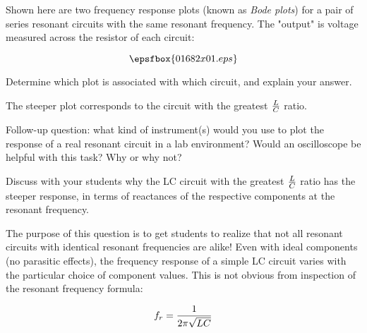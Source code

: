 

Shown here are two frequency response plots (known as {\it Bode plots}) for a pair of series resonant circuits with the same resonant frequency.  The "output" is voltage measured across the resistor of each circuit:

$$\epsfbox{01682x01.eps}$$

Determine which plot is associated with which circuit, and explain your answer.







The steeper plot corresponds to the circuit with the greatest ${L \over C}$ ratio.

\vskip 10pt

Follow-up question: what kind of instrument(s) would you use to plot the response of a real resonant circuit in a lab environment?  Would an oscilloscope be helpful with this task?  Why or why not?







Discuss with your students why the LC circuit with the greatest ${L \over C}$ ratio has the steeper response, in terms of reactances of the respective components at the resonant frequency.

The purpose of this question is to get students to realize that not all resonant circuits with identical resonant frequencies are alike!  Even with ideal components (no parasitic effects), the frequency response of a simple LC circuit varies with the particular choice of component values.  This is not obvious from inspection of the resonant frequency formula:

$$f_r = {1 \over {2 \pi \sqrt{LC}}}$$




